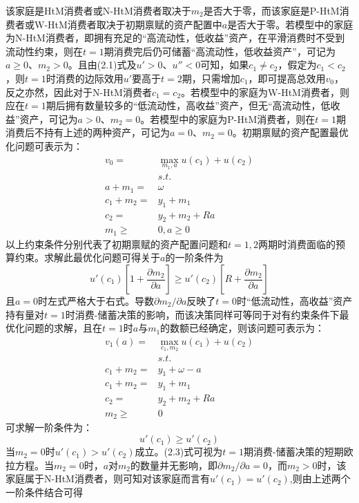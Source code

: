 \documentclass[supercite]{HustGraduPaper}
\begin{document}
    该家庭是HtM消费者或N-HtM消费者取决于$m_2$是否大于零，而该家庭是P-HtM消费者或W-HtM消费者取决于初期禀赋的资产配置中$a$是否大于零。若模型中的家庭为N-HtM消费者，即拥有充足的“高流动性，低收益”资产，在平滑消费时不受到流动性约束，则在$t=1$期消费完后仍可储蓄“高流动性，低收益资产”，可记为$a \geq 0$、$m_2>0$。且由(2.1)式及$u'>0$、$u''<0$可知，如果$c_1 \neq c_2$，假定为$c_1<c_2$，则$t=1$时消费的边际效用$u'$要高于$t=2$期，只需增加$c_1$，即可提高总效用$v_0$，反之亦然，因此对于N-HtM消费者$c_1=c_2$。若模型中的家庭为W-HtM消费者，则应在$t=1$期后拥有数量较多的“低流动性，高收益”资产，但无“高流动性，低收益”资产，可记为$a>0$、$m_2=0$。若模型中的家庭为P-HtM消费者，则在$t=1$期消费后不持有上述的两种资产，可记为$a=0$、$m_2=0$。初期禀赋的资产配置最优化问题可表示为：
    \begin{align*} 
    v_0= & \max_{m_1,a} u(c_1)+u(c_2)\\
    & s.t.\\
    a+m_1= & \omega\\
    c_1+m_2= & y_1+m_1\\
    c_2= & y_2+m_2+Ra\\
    m_1 \geq & 0,a \geq 0 
    \end{align*}
    以上约束条件分别代表了初期禀赋的资产配置问题和$t=1,2$两期时消费面临的预算约束。求解此最优化问题可得关于$a$的一阶条件为
    \begin{equation}
    u'(c_1)[1+\frac{\partial m_2}{\partial a}] \geq u'(c_2)[R+\frac{\partial m_2}{\partial a}]
    \end{equation}
    且$a=0$时左式严格大于右式。导数${\partial m_2}/{\partial a}$反映了$t=0$时“低流动性，高收益”资产持有量对$t=1$时消费-储蓄决策的影响，而该决策同样可等同于对有约束条件下最优化问题的求解，且在$t=1$时$a$与$m_1$的数额已经确定，则该问题可表示为：
    \begin{align*} 
    v_1(a)= & \max_{c_1,m_2} u(c_1)+u(c_2)\\
    & s.t.\\
    c_1+m_2= & y_1+\omega-a\\
    c_1+m_2= & y_1+m_1\\
    c_2= & y_2+m_2+Ra\\
    m_2 \geq & 0
    \end{align*}
    可求解一阶条件为：
    \begin{equation}
    u'(c_1) \geq u'(c_2)
    \end{equation}
    当$m_2=0$时$u'(c_1)>u'(c_2)$成立。(2.3)式可视为$t=1$期消费-储蓄决策的短期欧拉方程。当$m_2=0$时，$a$对$m_2$的数量并无影响，即${\partial m_2}/{\partial a} = 0$，而$m_2>0$时，该家庭属于N-HtM消费者，则可知对该家庭而言有$u'(c_1)=u'(c_2)$,则由上述两个一阶条件结合可得
\end{document}
